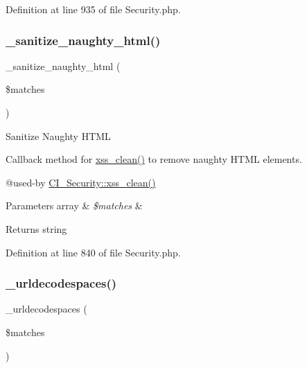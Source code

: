 Definition at line 935 of file Security.\+php.

\mbox{\label{class_c_i___security_af67689597607833df370031fb799c92b}} 
\subsubsection{\texorpdfstring{\_sanitize\_naughty\_html()}{\_sanitize\_naughty\_html()}}
{\footnotesize\ttfamily \+\_\+sanitize\+\_\+naughty\+\_\+html (\begin{DoxyParamCaption}\item[{}]{\$matches }\end{DoxyParamCaption})\hspace{0.3cm}{\ttfamily [protected]}}

Sanitize Naughty H\+T\+ML

Callback method for \mbox{\hyperlink{class_c_i___security_acb759426dbab128d3d8164805225381c}{xss\+\_\+clean()}} to remove naughty H\+T\+ML elements.

@used-\/by \mbox{\hyperlink{class_c_i___security_acb759426dbab128d3d8164805225381c}{C\+I\+\_\+\+Security\+::xss\+\_\+clean()}} 
\begin{DoxyParams}[1]{Parameters}
array & {\em \$matches} & \\
\hline
\end{DoxyParams}
\begin{DoxyReturn}{Returns}
string 
\end{DoxyReturn}


Definition at line 840 of file Security.\+php.

\mbox{\label{class_c_i___security_aed66bb1c40ccc25c96326da7c0e2088a}} 
\subsubsection{\texorpdfstring{\_urldecodespaces()}{\_urldecodespaces()}}
{\footnotesize\ttfamily \+\_\+urldecodespaces (\begin{DoxyParamCaption}\item[{}]{\$matches }\end{DoxyParamCaption})\hspace{0.3cm}{\ttfamily [protected]}}

